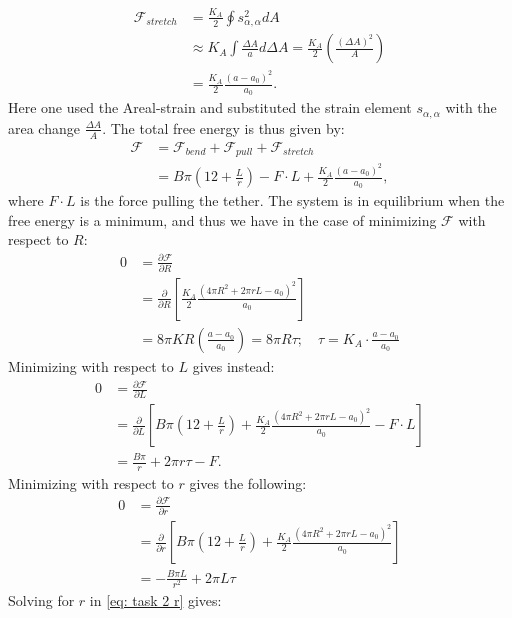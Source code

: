\documentclass[a4paper]{article}
\newcommand{\F}{\mathcal{F}}
\begin{document}
\begin{align*}
    \mathcal{F}_{stretch} &= \frac{K_A}{2}\oint s_{\alpha,\alpha}^2dA\\
    &\approx K_A \int \frac{\Delta A}{a}d\Delta A = \frac{K_A}{2}\left(\frac{(\Delta A)^2}{A}\right)\\
    &= \frac{K_A}{2}\frac{(a-a_0)^2}{a_0}.
\end{align*}Here one used the Areal-strain and substituted the strain element $s_{\alpha,\alpha}$ with the area change $\frac{\Delta A}{A}$. The total free energy is thus given by:
\begin{align*}
    \mathcal{F} &= \mathcal{F}_{bend} + \mathcal{F}_{pull} + \mathcal{F}_{stretch}\\
    &= B\pi\left(12 + \frac{L}{r}\right) - F\cdot L + \frac{K_A}{2}\frac{(a-a_0)^2}{a_0},
\end{align*}where $F\cdot L$ is the force pulling the tether. The system is in equilibrium when the free energy is a minimum, and thus we have in the case of minimizing $\F$ with respect to $R$:
\begin{align}
    0 &= \frac{\partial \F}{\partial R}\nonumber\\
    &= \frac{\partial }{\partial R}\left[\frac{K_A}{2}\frac{\left(4\pi R^2 + 2\pi rL - a_0\right)^2}{a_0}\right]\nonumber\\
    &= 8\pi K R\left(\frac{a - a_0}{a_0}\right) = 8\pi R\tau;\quad \tau = K_A \cdot\frac{a - a_0}{a_0}
\end{align}Minimizing with respect to $L$ gives instead:
\begin{align}
    0 &= \frac{\partial \F}{\partial L}\nonumber\\
    &= \frac{\partial }{\partial L}\left[B\pi\left(12 + \frac{L}{r}\right) +\frac{K_A}{2}\frac{\left(4\pi R^2 + 2\pi rL - a_0\right)^2}{a_0} - F\cdot L \right]\nonumber\\
    &= \frac{B\pi}{r} + 2\pi r \tau - F.\label{eq: task 2 final}
\end{align}Minimizing with respect to $r$ gives the following:
\begin{align}
    0 &= \frac{\partial \F}{\partial r}\nonumber\\
    &= \frac{\partial}{\partial r}\left[B\pi\left(12 + \frac{L}{r}\right) + \frac{K_A}{2}\frac{\left(4\pi R^2 + 2\pi rL - a_0\right)^2}{a_0}\right]\nonumber\\
    &= -\frac{B\pi L}{r^2} + 2\pi L\tau\label{eq: task 2 r}
\end{align} Solving for $r$ in \eqref{eq: task 2 r} gives:
\end{document}
